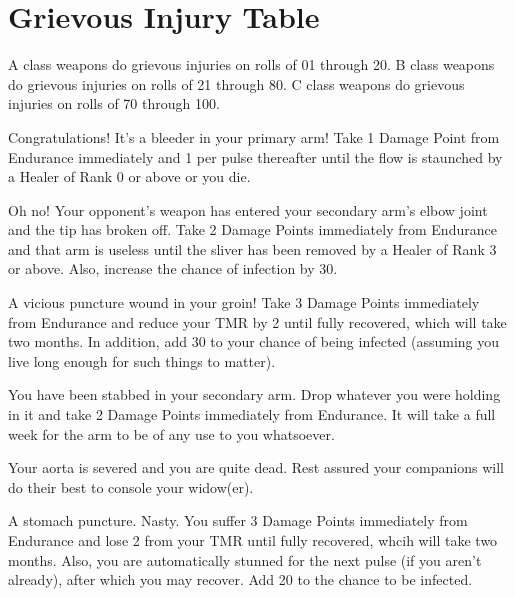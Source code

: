 \section{Grievous Injury Table}
\label{tables:grievous}

\begin{multicols}{3}


A class weapons do grievous injuries on rolls of 01 through 20.  B
class weapons do grievous injuries on rolls of 21 through 80.  C class
weapons do grievous injuries on rolls of 70 through 100.

{\fontsize{8}{8.5}\selectfont
\setlength\leftmargini{1.0em}
\begin{description}

\setlength{\itemsep}{0pt}

\item[01--05] Congratulations!  It's a bleeder in your primary arm!
Take 1 Damage Point from Endurance immediately and 1 per pulse
thereafter until the flow is staunched by a Healer of Rank 0 or above
or you die.

\item[06--07] Oh no!  Your opponent's weapon has entered your
secondary arm's elbow joint and the tip has broken off.  Take 2
Damage Points immediately from Endurance and that arm is useless until
the sliver has been removed by a Healer of Rank 3 or above.  Also,
increase the chance of infection by 30.

\item[08] A vicious puncture wound in your groin!  Take 3 Damage
Points immediately from Endurance and reduce your TMR by 2 until fully
recovered, which will take two months.  In addition, add 30 to your
chance of being infected (assuming you live long enough for such
things to matter).

\item[09--10] You have been stabbed in your secondary arm.  Drop
whatever you were holding in it and take 2 Damage Points immediately
from Endurance.  It will take a full week for the arm to be of any use
to you whatsoever.

\item[11] Your aorta is severed and you are quite dead.  Rest assured
your companions will do their best to console your widow(er).

\item[12] A stomach puncture.  Nasty. You suffer 3 Damage Points
immediately from Endurance and lose 2 from your TMR until fully
recovered, whcih will take two months.  Also, you are automatically
stunned for the next pulse (if you aren't already), after which you
may recover.  Add 20 to the chance to be infected. 


\end{description}}
\end{multicols}
